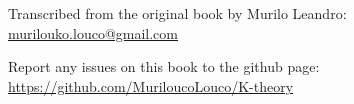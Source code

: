 \pagebreak
\hspace{0pt}
\vfill
\begin{center}
Transcribed from the original book by Murilo Leandro: \\
\href{mailto:murilouko.louco@gmail.com}{murilouko.louco@gmail.com} \\ \hfill

Report any issues on this book to the github page: \\
\href{https://github.com/MuriloucoLouco/K-theory}{https://github.com/MuriloucoLouco/K-theory}
\end{center}
\vfill
\hspace{0pt}
\pagebreak
